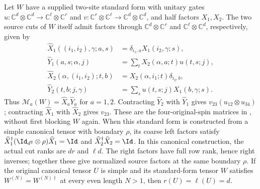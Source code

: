 \begin{lemma}
    \label{lem:mpu_supplied_standard_form_source_cuts}
    \leanok
    Let $W$ have a supplied two-site standard form with unitary gates
    $u:\mathbb C^d\otimes\mathbb C^d\to\mathbb C^\ell\otimes\mathbb C^r$ and
    $v:\mathbb C^r\otimes\mathbb C^\ell\to\mathbb C^d\otimes\mathbb C^d$,
    and half factors $X_1,X_2$.
    The two source cuts of $W$ itself admit factors through
    $\mathbb C^d\otimes\mathbb C^r$ and
    $\mathbb C^\ell\otimes\mathbb C^d$, respectively, given by
    \begin{align}
        \widehat X_1((i_1,i_2),\gamma;a,s)
         & =\delta_{i_1,a}X_1(i_2,\gamma;s), \\
        \widehat Y_1(a,s;\alpha,j)
         & =\sum_t X_2(\alpha,a;t)u(t,s;j),  \\
        \widehat X_2(\alpha,(i_1,i_2);t,b)
         & =X_2(\alpha,i_1;t)\delta_{i_2,b}, \\
        \widehat Y_2(t,b;j,\gamma)
         & =\sum_s u(t,s;j)X_1(b,\gamma;s).
    \end{align}
    Thus $\mathcal M_a(W)=\widehat X_a\widehat Y_a$ for $a=1,2$.
    Contracting $\widehat Y_2$ with $\widehat Y_1$ gives
    $v_{23}(u_{12}\otimes u_{34})$; contracting $\widehat X_1$ with
    $\widehat X_2$ gives $v_{23}$. These are the four-original-spin
    matrices in \cite[lines~1237--1252]{Cirac2017MPU}, without first
    blocking $W$ again. When this standard form is constructed from a simple
    canonical tensor with boundary $\rho$, its coarse left factors satisfy
    $\widehat X_1^\dagger(\Id_{d^2}\otimes\rho)\widehat X_1=\Id$ and
    $\widehat X_2^\dagger\widehat X_2=\Id$. In this canonical construction,
    the actual cut ranks are $d r$ and $\ell d$. The right factors have
    full row rank, hence right inverses; together these give normalized
    source factors at the same boundary $\rho$. If the original canonical
    tensor $U$ is simple and its standard-form tensor $W$ satisfies
    $W^{(N)}=W^{(N)\dagger}$ at every even length $N>1$, then
    $r(U)=\ell(U)=d$.
\end{lemma}

